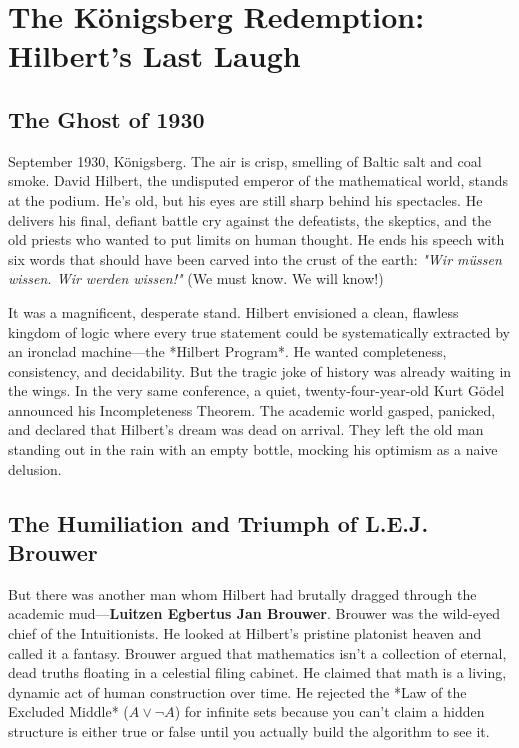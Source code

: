 \documentclass[11pt,a4paper]{article}
\begin{document}
\section{The Königsberg Redemption: Hilbert's Last Laugh}

\subsection{The Ghost of 1930}
September 1930, Königsberg. The air is crisp, smelling of Baltic salt and coal smoke. David Hilbert, the undisputed emperor of the mathematical world, stands at the podium. He’s old, but his eyes are still sharp behind his spectacles. He delivers his final, defiant battle cry against the defeatists, the skeptics, and the old priests who wanted to put limits on human thought. He ends his speech with six words that should have been carved into the crust of the earth: \textit{"Wir müssen wissen. Wir werden wissen!"} (We must know. We will know!)

It was a magnificent, desperate stand. Hilbert envisioned a clean, flawless kingdom of logic where every true statement could be systematically extracted by an ironclad machine—the *Hilbert Program*. He wanted completeness, consistency, and decidability. But the tragic joke of history was already waiting in the wings. In the very same conference, a quiet, twenty-four-year-old Kurt Gödel announced his Incompleteness Theorem. The academic world gasped, panicked, and declared that Hilbert’s dream was dead on arrival. They left the old man standing out in the rain with an empty bottle, mocking his optimism as a naive delusion.

\subsection{The Humiliation and Triumph of L.E.J. Brouwer}
But there was another man whom Hilbert had brutally dragged through the academic mud—\textbf{Luitzen Egbertus Jan Brouwer}. Brouwer was the wild-eyed chief of the Intuitionists. He looked at Hilbert's pristine platonist heaven and called it a fantasy. Brouwer argued that mathematics isn't a collection of eternal, dead truths floating in a celestial filing cabinet. He claimed that math is a living, dynamic act of human construction over time. He rejected the *Law of the Excluded Middle* ($A \lor \neg A$) for infinite sets because you can't claim a hidden structure is either true or false until you actually build the algorithm to see it.
\end{document}
